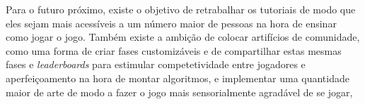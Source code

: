 \documentclass[conference]{IEEEtran}
\begin{document}
Para o futuro próximo, existe o objetivo de retrabalhar os tutoriais de modo que eles sejam mais acessíveis a um número maior de pessoas na hora de ensinar como jogar o jogo. Também existe a ambição de colocar artifícios de comunidade, como uma forma de criar fases customizáveis e de compartilhar estas mesmas fases e \textit{leaderboards} para estimular competetividade entre jogadores e aperfeiçoamento na hora de montar algoritmos, e implementar uma quantidade maior de arte de modo a fazer o jogo mais sensorialmente agradável de se jogar,


%
\end{document}

